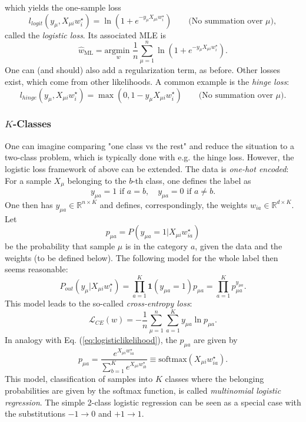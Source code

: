 \documentclass{article}
\begin{document}
which yields the one-sample loss
\begin{equation}
    l_{logit}(y_{\mu}, X_{\mu i} w^{\star}_i)
    =
    \ln\left(1+e^{-y_{\mu} X_{\mu i} w^{\star}_i}\right)
    \quad\quad \text{(No summation over $\mu$)},
\end{equation}
called the \emph{logistic loss}. Its associated MLE is
\begin{equation}
    \hat{w}_{\text{ML}} = \underset{w}{\text{argmin }} \frac{1}{n}\sum_{\mu = 1}^{n}
    \ln\left(1+e^{-y_{\mu} X_{\mu i} w^{\star}_i}\right).
\end{equation}
One can (and should) also add a regularization term, as before. Other losses exist, which come from other likelihoods. A common example is the \emph{hinge loss}:
\begin{equation}
    l_{hinge}(y_{\mu}, X_{\mu i} w^{\star}_i)
    =
    \max (0,1-y_{\mu} X_{\mu i} w^{\star}_i)
    \quad\quad \text{(No summation over $\mu$)}.
\end{equation}
\subsubsection*{$K$-Classes}
One can imagine comparing "one class vs the rest" and reduce the situation to a two-class problem, which is typically done with e.g. the hinge loss. However, the logistic loss framework of above can be extended. The data is \emph{one-hot encoded}: For a sample $X_{\mu}$ belonging to the $b$-th class, one defines the label as
\begin{equation}
    y_{\mu a} = 1 \text{ if } a=b,\quad y_{\mu a} = 0 \text{ if } a\neq b.
\end{equation}
One then has $y_{\mu a} \in \mathbb{R}^{n\times K}$ and defines, correspondingly, the weights $w_{i a} \in \mathbb{R}^{d\times K}$. Let $$p_{\mu a} = P(y_{\mu a} = 1| X_{\mu i} w^{\star}_{ia})$$ be the probability that sample $\mu$ is in the category $a$, given the data and the weights (to be defined below). The following model for the whole label then seems reasonable:
\begin{equation}
    P_{out}(y_{\mu}| X_{\mu i} w^{\star}_i)
    =
    \prod_{a=1}^{K} \mathbf{1}(y_{\mu a}=1) p_{\mu a}
    =
    \prod_{a=1}^{K} p_{\mu a}^{y_{\mu a}}.
\end{equation}
This model leads to the so-called \emph{cross-entropy loss}:
\begin{equation}
    \mathcal{L}_{CE}(w)
    =
    -\frac{1}{n} \sum_{\mu = 1}^{n}\sum_{a=1}^{K}
    y_{\mu a} \ln{p_{\mu a}}.
\end{equation}
In analogy with Eq. (\ref{eq:logisticlikelihood}), the $p_{\mu a}$ are given by
\begin{equation}
    p_{\mu a}
    =
    \frac{e^{X_{\mu i} w^{\star}_{ia}}}{\sum_{b=1}^{K} e^{X_{\mu i} w^{\star}_{ib}}}
    \equiv
    \text{softmax}(X_{\mu i} w^{\star}_{ia}).
    \label{eq:softmax}
\end{equation}
This model, classification of samples into $K$ classes where the belonging probabilities are given by the softmax function, is called \emph{multinomial logistic regression}. The simple 2-class logistic regression can be seen as a special case with the substitutions $-1\rightarrow 0$ and $+1\rightarrow 1$.
\end{document}

